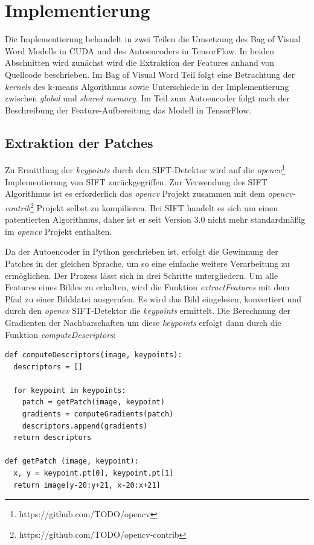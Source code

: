 \chapter{Implementierung}

Die Implementierung behandelt in zwei Teilen die Umsetzung des Bag of Visual Word Modells in CUDA und des Autoencoders in TensorFlow. In beiden Abschnitten wird zunächst wird die Extraktion der Features anhand von Quellcode beschrieben. Im Bag of Visual Word Teil folgt eine Betrachtung der \textit{kernels} des k-means Algorithmus sowie Unterschiede in der Implementierung zwischen \textit{global} und \textit{shared memory}. Im Teil zum Autoencoder folgt nach der Beschreibung der Feature-Aufbereitung das Modell in TensorFlow.


\section{Extraktion der Patches}

Zu Ermittlung der \textit{keypoints} durch den SIFT-Detektor wird auf die \textit{opencv}\footnote{https://github.com/TODO/opencv} Implementierung von SIFT zurückgegriffen. Zur Verwendung des SIFT Algorithmus ist es erforderlich das \textit{opencv} Projekt zusammen mit dem \textit{opencv-contrib}\footnote{https://github.com/TODO/opencv-contrib} Projekt selbst zu kompilieren. Bei SIFT handelt es sich um einen patentierten Algorithmus, daher ist er seit Version 3.0 nicht mehr standardmäßig im \textit{opencv} Projekt enthalten.

Da der Autoencoder in Python geschrieben ist, erfolgt die Gewinnung der Patches in der gleichen Sprache, um so eine einfache weitere Verarbeitung zu ermöglichen. Der Prozess lässt sich in drei Schritte untergliedern. Um alle Features eines Bildes zu erhalten, wird die Funktion \textit{extractFeatures} mit dem Pfad zu einer Bilddatei ausgerufen. Es wird das Bild eingelesen, konvertiert und durch den \textit{opencv} SIFT-Detektor die \textit{keypoints} ermittelt. Die Berechnung der Gradienten der Nachbarschaften um diese \textit{keypoints} erfolgt dann durch die Funktion \textit{computeDescriptors}:

\lstset{language=Python}
\begin{lstlisting}
def computeDescriptors(image, keypoints):
  descriptors = []
  
  for keypoint in keypoints:
  	patch = getPatch(image, keypoint)
  	gradients = computeGradients(patch)
  	descriptors.append(gradients)
  return descriptors
  
def getPatch (image, keypoint):
  x, y = keypoint.pt[0], keypoint.pt[1]
  return image[y-20:y+21, x-20:x+21]
\end{lstlisting}

